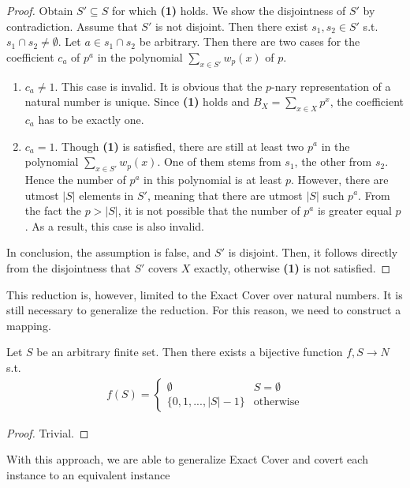 \begin{proof}
    \label{lemma:sscompl}
    Obtain $S' \subseteq S$ for which \textbf{(1)} holds. We show the disjointness of $S'$ by contradiction. 
Assume that $S'$ is not disjoint. Then there exist $s_1, s_2 \in S'$ s.t. $s_1 \cap s_2 \not= \emptyset$. Let $a \in s_1 \cap s_2$ be arbitrary. Then 
there are two cases for the coefficient $c_a$ of $p^a$ in the polynomial $\sum_{x \in S'} w_p(x)$ of $p$. 
\begin{enumerate}
    \item $c_a \neq 1$. This case is invalid. It is obvious that the $p$-nary representation of 
    a natural number is unique. Since \textbf{(1)} holds and $B_X = \sum_{x \in X} {p^x}$, the coefficient 
    $c_a$ has to be exactly one.
    \item $c_a = 1$. Though \textbf{(1)} is satisfied, there are still at least two $p^a$ in the polynomial $\sum_{x \in S'} w_p(x)$.
    One of them stems from $s_1$, the other from $s_2$.
    Hence the number of $p^a$ in this polynomial is at least $p$. However, there are utmost $|S|$ elements in $S'$, meaning that there are utmost $|S|$ such $p^a$. From the 
    fact the $p > |S|$, it is not possible that the number of $p^a$ is greater equal $p$. As a result, this case is also invalid.
\end{enumerate}
In conclusion, the assumption is false, and $S'$ is disjoint. Then, it follows directly from the disjointness that $S'$ covers $X$ exactly, otherwise \textbf{(1)}
is not satisfied.
\end{proof}
This reduction is, however, limited to the Exact Cover over natural numbers. It is still necessary to generalize the reduction. 
For this reason, we need to construct a mapping.
\begin{lemma}
    \label{lemma:9}
    Let $S$ be an arbitrary finite set. Then there exists a bijective function $f, S \rightarrow N$ s.t. 
    \begin{align*}
        f(S) = \begin{cases}
            \emptyset & S = \emptyset \\ 
            \{0, 1, ..., |S| - 1\} & \text{otherwise}
        \end{cases}
    \end{align*}
\end{lemma}
\begin{proof}
    Trivial.
\end{proof}
With this approach, we are able to generalize Exact Cover and covert each instance to an equivalent instance 
